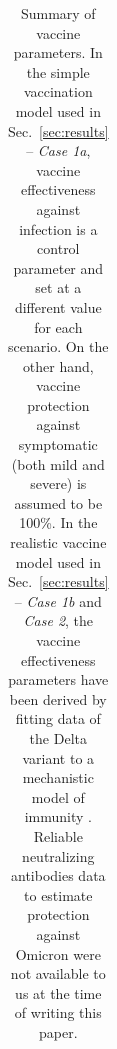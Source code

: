 \documentclass[article, a4, authoryear]{elsarticle}
\begin{document}
\begin{table}[h]
\begin{tabular}{|
>{}c |
>{}c |
>{}c |
>{}c |
>{}c |}
\end{tabular}
\caption{{\label{table:vax-params} Summary of vaccine parameters. In the simple vaccination model used in Sec.~\ref{sec:results} -- \textit{Case 1a}, vaccine effectiveness against infection is a control parameter and set at a different value for each scenario. On the other hand, vaccine protection against symptomatic (both mild and severe) is assumed to be 100\%. In the realistic vaccine model used in Sec.~\ref{sec:results} -- \textit{Case 1b} and \textit{Case 2}, the vaccine effectiveness parameters have been derived by fitting data of the Delta variant to a mechanistic model of immunity \cite{cohen2021mechanistic}. Reliable neutralizing antibodies data to estimate protection against Omicron were not available to us at the time of writing this paper.}}
\end{table}
\end{document}
